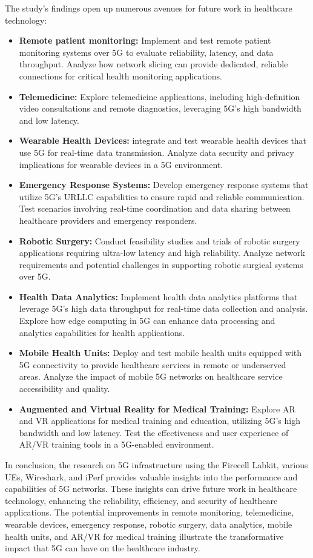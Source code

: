 \documentclass{report}
\begin{document}
The study's findings open up numerous avenues for future work in healthcare technology:
\begin{itemize}
\item \textbf{Remote patient monitoring:} Implement and test remote patient monitoring systems over 5G to evaluate reliability, latency, and data throughput. Analyze how network slicing can provide dedicated, reliable connections for critical health monitoring applications. 
\item \textbf{Telemedicine:} Explore telemedicine applications, including high-definition video consultations and remote diagnostics, leveraging 5G's high bandwidth and low latency.
\item \textbf{Wearable Health Devices:} integrate and test wearable health devices that use 5G for real-time data transmission. Analyze data security and privacy implications for wearable devices in a 5G environment.
\item \textbf{Emergency Response Systems:} Develop emergency response systems that utilize 5G’s URLLC capabilities to ensure rapid and reliable communication. Test scenarios involving real-time coordination and data sharing between healthcare providers and emergency responders.
\item \textbf{Robotic Surgery:} Conduct feasibility studies and trials of robotic surgery applications requiring ultra-low latency and high reliability. Analyze network requirements and potential challenges in supporting robotic surgical systems over 5G.
\item \textbf{Health Data Analytics:} Implement health data analytics platforms that leverage 5G’s high data throughput for real-time data collection and analysis. Explore how edge computing in 5G can enhance data processing and analytics capabilities for health applications.
\item \textbf{Mobile Health Units:} Deploy and test mobile health units equipped with 5G connectivity to provide healthcare services in remote or underserved areas. Analyze the impact of mobile 5G networks on healthcare service accessibility and quality.
\item \textbf{Augmented and Virtual Reality for Medical Training:} Explore AR and VR applications for medical training and education, utilizing 5G’s high bandwidth and low latency. Test the effectiveness and user experience of AR/VR training tools in a 5G-enabled environment.
\end{itemize}
In conclusion, the research on 5G infrastructure using the Firecell Labkit, various UEs, Wireshark, and iPerf provides valuable insights into the performance and capabilities of 5G networks. These insights can drive future work in healthcare technology, enhancing the reliability, efficiency, and security of healthcare applications. The potential improvements in remote monitoring, telemedicine, wearable devices, emergency response, robotic surgery, data analytics, mobile health units, and AR/VR for medical training illustrate the transformative impact that 5G can have on the healthcare industry.
\end{document}
